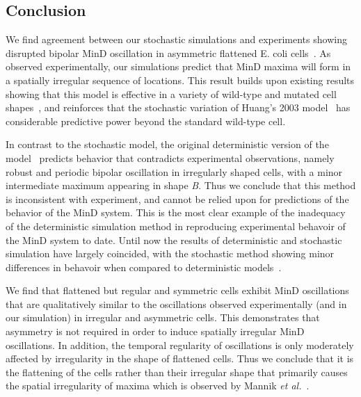 \documentclass{pnastwo}
\begin{document}
\begin{article}
\section{Conclusion}

We find agreement between our stochastic simulations and experiments
showing disrupted bipolar MinD oscillation in asymmetric flattened
E. coli cells~\cite{mannik2012robustness}.  As observed
experimentally, our simulations predict that MinD maxima will form in
a spatially irregular sequence of locations.  This result builds upon
existing results showing that this model is effective in a variety of
wild-type and mutated cell shapes~\cite{fange2006noise, varma2008min,
  kruse2007experimentalist}, and reinforces that the stochastic
variation of Huang's 2003 model~\cite{fange2006noise,
  kerr2006division} has considerable predictive power beyond the
standard wild-type cell.


%

In contrast to the stochastic model, the original deterministic
version of the model~\cite{huang2003dynamic} predicts behavior that
contradicts experimental observations, namely robust and periodic
bipolar oscillation in irregularly shaped cells, with a minor
intermediate maximum appearing in shape \emph{B}.  Thus we conclude
that this method is inconsistent with experiment, and cannot be relied
upon for predictions of the behavior of the MinD system.  This is the
most clear example of the inadequacy of the deterministic simulation
method in reproducing experimental behavoir of the MinD system to
date.  Until now the results of deterministic and stochastic
simulation have largely coincided, with the stochastic method showing
minor differences in behavoir when compared to deterministic
models~\cite{kerr2006division, fange2006noise, huang2004min,
  kruse2007experimentalist}.

We find that flattened but regular and symmetric cells exhibit MinD
oscillations that are qualitatively similar to the oscillations
observed experimentally (and in our simulation) in irregular and
asymmetric cells.  This demonstrates that asymmetry is not required in
order to induce spatially irregular MinD oscillations.  In addition,
the temporal regularity of oscillations is only moderately affected by
irregularity in the shape of flattened cells.  Thus we conclude
that it is the flattening of the cells rather than their irregular
shape that primarily causes the spatial irregularity of maxima which
is observed by Mannik \emph{et al.}~\cite{mannik2012robustness}.


\end{article}
\end{document}

